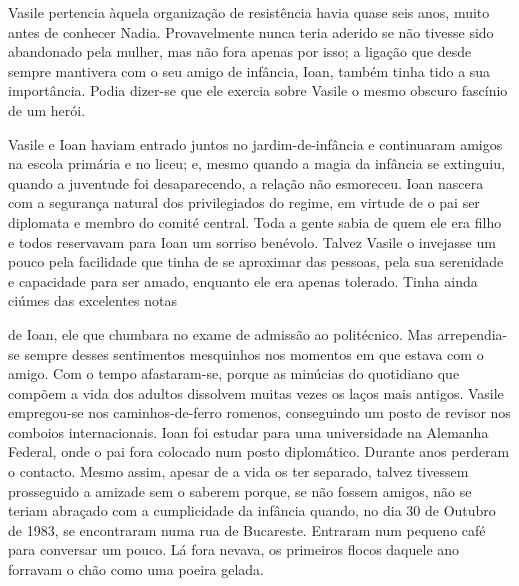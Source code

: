 \bigskip

Vasile pertencia àquela organização de resistência havia quase seis
anos, muito antes de conhecer Nadia. Provavelmente nunca teria aderido
se não tivesse sido abandonado pela mulher, mas não fora apenas por
isso; a ligação que desde sempre mantivera com o seu amigo de infância,
Ioan, também tinha tido a sua importância. Podia dizer-se que ele
exercia sobre Vasile o mesmo obscuro fascínio de um herói.

Vasile e Ioan haviam entrado juntos no jardim-de-infância e continuaram amigos na escola primária e no liceu; e, mesmo
quando a magia da infância se extinguiu, quando a juventude foi
desaparecendo, a relação não esmoreceu. Ioan nascera com a segurança
natural dos privilegiados do regime, em virtude de o pai ser diplomata e
membro do comité central. Toda a gente sabia de quem ele era filho e
todos reservavam para Ioan um sorriso benévolo. Talvez Vasile o
invejasse um pouco pela facilidade que tinha de se aproximar das
pessoas, pela sua serenidade e capacidade para ser amado, enquanto ele
era apenas tolerado. Tinha ainda ciúmes das excelentes notas

de Ioan, ele que chumbara no exame de admissão ao politécnico. Mas
arrependia-se sempre desses sentimentos mesquinhos nos momentos em que
estava com o amigo. Com o tempo afastaram-se, porque as minúcias do
quotidiano que compõem a vida dos adultos dissolvem muitas vezes os
laços mais antigos. Vasile empregou-se nos caminhos-de-ferro romenos,
conseguindo um posto de revisor nos comboios internacionais. Ioan foi
estudar para uma universidade na Alemanha Federal, onde o pai fora
colocado num posto diplomático. Durante anos perderam o contacto. Mesmo
assim, apesar de a vida os ter separado, talvez tivessem prosseguido a
amizade sem o saberem porque, se não fossem amigos, não se teriam
abraçado com a cumplicidade da infância quando, no dia 30 de Outubro de
1983, se encontraram numa rua de Bucareste. Entraram num pequeno café
para conversar um pouco. Lá fora nevava, os primeiros flocos daquele ano
forravam o chão como uma poeira gelada.

